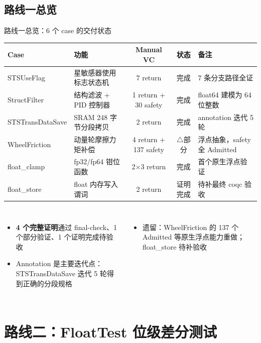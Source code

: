 \documentclass[UTF8,aspectratio=169]{ctexbeamer}
\newcommand{\okmark}{\textcolor{okgreen}{\checkmark}}
\newcommand{\warnmark}{\textcolor{warnorange}{$\triangle$}}
\begin{document}
\subsection{路线一总览}
\begin{frame}{路线一总览：6 个 case 的交付状态}
  \centering\scriptsize
  \begin{tabular}{@{}llccp{4.1cm}@{}}
    \toprule
    Case & 功能 & Manual VC & 状态 & 备注 \\
    \midrule
    STSUseFlag & 星敏感器使用标志状态机 & 7 return & \okmark 完成 & 7 条分支路径全证 \\
    StructFilter & 结构滤波 + PID 控制器 & 1 return + 30 safety & \okmark 完成 & float64 建模为 64 位整数 \\
    STSTransDataSave & SRAM 248 字节分段拷贝 & 2 return & \okmark 完成 & annotation 迭代 5 轮 \\
    WheelFriction & 动量轮摩擦力矩补偿 & 4 return + 137 safety & \warnmark 部分 & 浮点抽象，safety 全 Admitted \\
    float\_clamp & fp32/fp64 钳位函数 & 2$\times$3 return & \okmark 完成 & 首个原生浮点验证 \\
    float\_store & float 内存写入谓词 & 2 return & \okmark 证明完成 & 待补最终 coqc 验收 \\
    \bottomrule
  \end{tabular}
  \vspace{1em}
  \begin{columns}[T]
    \begin{itemize}\small
      \item \textbf{4 个完整证明}通过 final-check、1 个部分验证、1 个证明完成待验收
      \item Annotation 是主要迭代点：STSTransDataSave 迭代 5 轮得到正确的分段规格
    \end{itemize}
    \begin{itemize}\small
      \item 遗留：WheelFriction 的 137 个 Admitted 等原生浮点能力重做；float\_store 待补验收
    \end{itemize}
  \end{columns}
\end{frame}

\section{路线二：FloatTest 位级差分测试}
\end{document}
